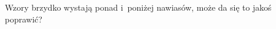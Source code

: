 \vspace{\VerSpaceFour}











\vspace{0em}


\noindent
{} Wzory brzydko wystają ponad i~poniżej nawiasów,
może da się to jakoś poprawić?

\vspace{\VerSpaceFour}





\noindent
{}

\vspace{\VerSpaceFour}





